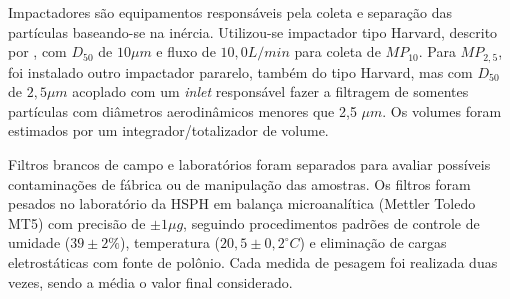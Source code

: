 Impactadores são equipamentos responsáveis pela coleta e separação das 
partículas baseando-se na inércia. Utilizou-se impactador tipo Harvard, 
descrito por \citet{marple1987}, com $D_{50}$ de $10 \mu m$ e fluxo de 
$10,0 L/min$ para coleta de $MP_{10}$. Para $MP_{2,5}$, foi instalado 
outro impactador pararelo, também do tipo Harvard, mas com $D_{50}$ de 
$2,5 \mu m$ acoplado com um \textit{inlet} responsável fazer a filtragem de 
somentes partículas com diâmetros aerodinâmicos menores que 2,5 $\mu m$. 
Os volumes foram estimados por um integrador/totalizador de volume.

Filtros brancos de campo e laboratórios foram separados para avaliar 
possíveis contaminações de fábrica ou de manipulação das amostras. 
Os filtros foram pesados no laboratório da HSPH em balança 
microanalítica (Mettler Toledo MT5) com precisão de $\pm 1 \mu g$, 
seguindo procedimentos padrões de controle de umidade ($39 \pm 2 \%$), 
temperatura ($20,5 \pm 0,2 ^{\circ} C$) e eliminação de cargas eletrostáticas 
com fonte de polônio. 
Cada medida de pesagem foi realizada duas vezes, sendo a média o valor 
final considerado.
